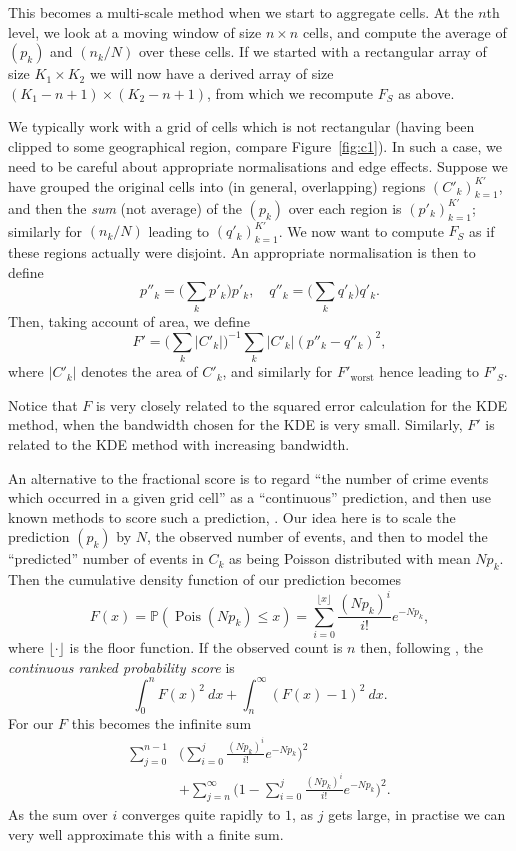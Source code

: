 \documentclass[twoside,a4paper,twocolumn,10pt]{article}
\theoremstyle{plain}
\theoremstyle{definition}
\begin{document}
This becomes a multi-scale method when we start to aggregate cells.  At the $n$th level,
we look at a moving window of size $n\times n$ cells, and compute the average of $(p_k)$
and $(n_k/N)$ over these cells.  If we started with a rectangular array of size $K_1\times K_2$
we will now have a derived array of size $(K_1-n+1) \times (K_2-n+1)$, from which we recompute
$F_S$ as above.

We typically work with a grid of cells which is not rectangular (having been clipped to some
geographical region, compare Figure~\ref{fig:c1}).  In such a case, we need to
be careful about appropriate normalisations and edge effects.  Suppose we have grouped the original
cells into (in general, overlapping) regions $(C'_k)_{k=1}^{K'}$, and then the \emph{sum} (not
average) of the $(p_k)$ over each region is $(p'_k)_{k=1}^{K'}$; similarly for $(n_k/N)$ leading
to $(q'_k)_{k=1}^{K'}$.  We now want to compute $F_S$ as if these regions actually were disjoint.
An appropriate normalisation is then to define
\[ p''_k = \Big(\sum_k p'_k\Big) p'_k, 
\quad
q''_k = \Big(\sum_k q'_k\Big) q'_k. \]
Then, taking account of area, we define
\[ F' = \Big( \sum_k |C'_k| \Big)^{-1} \sum_k |C'_k| (p''_k - q''_k)^2, \]
where $|C'_k|$ denotes the area of $C'_k$, and similarly for $F'_{\text{worst}}$
hence leading to $F'_S$.

Notice that $F$ is very closely related to the squared error calculation for the KDE
method, when the bandwidth chosen for the KDE is very small.  Similarly, $F'$ is related
to the KDE method with increasing bandwidth.

An alternative to the fractional score is to regard ``the number of crime events which occurred
in a given grid cell'' as a ``continuous'' prediction, and then use known methods to
score such a prediction, \cite[Section~7.5.2]{js}.  Our idea here is to scale the prediction
$(p_k)$ by $N$, the observed number of events, and then to model the ``predicted'' number of
events in $C_k$ as being Poisson distributed with mean $Np_k$.  Then the cumulative density
function of our prediction becomes
\[ F(x) = \mathbb P( \operatorname{Pois}(Np_k) \leq x ) =
\sum_{i=0}^{\lfloor x \rfloor} \frac{(Np_k)^i}{i!} e^{-Np_k}, \]
where $\lfloor \cdot \rfloor$ is the floor function.  If the observed count is $n$ then,
following \cite[Section~7.5.2]{js}, the \emph{continuous ranked probability score} is
\[ \int_0^n F(x)^2 \ dx + \int_n^\infty (F(x)-1)^2 \ dx. \]
For our $F$ this becomes the infinite sum
\begin{align*}
\sum_{j=0}^{n-1} & \Big(\sum_{i=0}^{j} \frac{(Np_k)^i}{i!} e^{-Np_k}\Big)^2 \\
&+ \sum_{j=n}^{\infty} \Big(1 - \sum_{i=0}^{j} \frac{(Np_k)^i}{i!} e^{-Np_k}\Big)^2.
\end{align*}
As the sum over $i$ converges quite rapidly to $1$, as $j$ gets large, in practise we
can very well approximate this with a finite sum.
\end{document}
